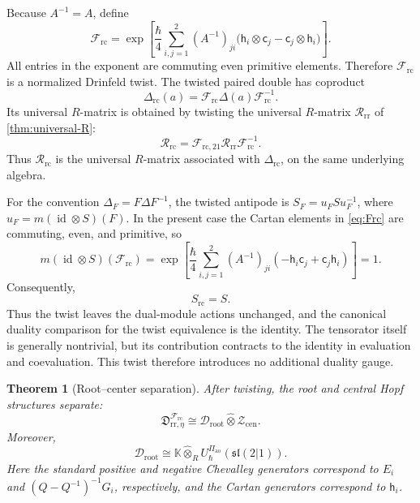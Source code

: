 \documentclass[11pt,a4paper]{article}
\newcommand{\hK}{\mathbb K}
\newcommand{\ot}{\otimes}
\newcommand{\hot}{\widehat\otimes}
\newcommand{\id}{\operatorname{id}}
\newcommand{\ao}{\mathrm{ao}}
\newcommand{\rc}{\mathrm{rc}}
\newcommand{\cen}{\mathrm{cen}}
\newcommand{\rootpart}{\mathrm{root}}
\newtheorem{theorem}{Theorem}[section]
\theoremstyle{definition}
\theoremstyle{remark}
\begin{document}
Because \(A^{-1}=A\), define
\begin{equation}\label{eq:Frc}
\mathcal F_{\rc}
=
\exp\!\left[
\frac{\hbar}{4}
\sum_{i,j=1}^2(A^{-1})_{ji}
\bigl(\mathsf h_i\ot\mathsf c_j-\mathsf c_j\ot\mathsf h_i\bigr)
\right].
\end{equation}
All entries in the exponent are commuting even primitive elements.
Therefore \(\mathcal F_{\rc}\) is a normalized Drinfeld twist.
The twisted paired double has coproduct
\[
 \Delta_{\rc}(a)=\mathcal F_{\rc}\Delta(a)\mathcal F_{\rc}^{-1}.
\]
Its universal \(R\)-matrix is obtained by twisting the universal
\(R\)-matrix \(\mathcal R_{\mathrm{rr}}\) of \cref{thm:universal-R}:
\begin{equation}\label{eq:twisted-universal-R}
 \mathcal R_{\rc}
 =\mathcal F_{\rc,21}\mathcal R_{\mathrm{rr}}
  \mathcal F_{\rc}^{-1}.
\end{equation}
Thus \(\mathcal R_{\rc}\) is the universal \(R\)-matrix associated
with \(\Delta_{\rc}\), on the same underlying algebra.

For the convention \(\Delta_F=F\Delta F^{-1}\), the twisted antipode
is \(S_F=u_FS u_F^{-1}\), where
\(u_F=m(\id\ot S)(F)\).  In the present case the Cartan elements in
\eqref{eq:Frc} are commuting, even, and primitive, so
\[
 m(\id\ot S)(\mathcal F_{\rc})
 =\exp\!\left[
 \frac{\hbar}{4}\sum_{i,j=1}^2(A^{-1})_{ji}
 (-\mathsf h_i\mathsf c_j+\mathsf c_j\mathsf h_i)
 \right]=1.
\]
Consequently,
\begin{equation}\label{eq:twist-antipode-unchanged}
 S_{\rc}=S.
\end{equation}
Thus the twist leaves the dual-module actions unchanged, and the
canonical duality comparison for the twist equivalence is the identity.
The tensorator itself is generally nontrivial, but its contribution
contracts to the identity in evaluation and coevaluation.  This twist
therefore introduces no additional duality gauge.

\begin{theorem}[Root--center separation]\label{thm:root-center}
After twisting, the root and central Hopf structures separate:
\begin{equation}\label{eq:Hopf-factor}
 \mathfrak D_{\mathrm{rr},\eta}^{\mathcal F_{\rc}}
 \cong\mathcal D_{\rootpart}\hot\mathcal Z_{\cen}.
\end{equation}
Moreover,
\[
 \mathcal D_{\rootpart}
 \cong
 \hK\hot_R U_\hbar^{\Pi_{\ao}}(\mathfrak{sl}(2|1)).
\]
Here the standard positive and negative Chevalley generators correspond
to \(E_i\) and \((Q-Q^{-1})^{-1}G_i\), respectively, and the Cartan
generators correspond to \(\mathsf h_i\).
\end{theorem}
\end{document}
